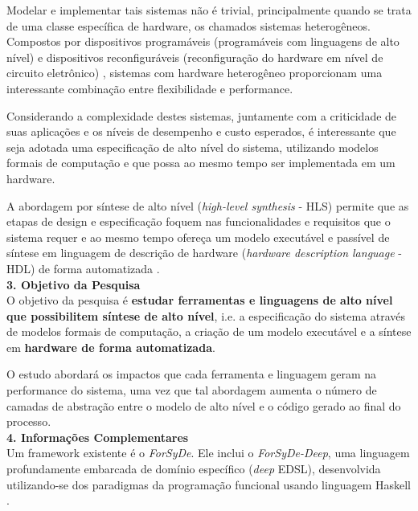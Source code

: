 Modelar e implementar tais sistemas não é trivial, principalmente quando se
trata de uma classe específica de hardware, os chamados sistemas
heterogêneos. Compostos por dispositivos programáveis (programáveis com
linguagens de alto nível) e dispositivos reconfiguráveis (reconfiguração do
hardware em nível de circuito eletrônico) \cite{Loubach2016a}, sistemas com
hardware heterogêneo proporcionam uma interessante combinação entre
flexibilidade e performance.

Considerando a complexidade destes sistemas, juntamente com a criticidade de suas aplicações e os níveis de desempenho e custo esperados, é interessante que seja adotada uma especificação de alto nível do sistema, utilizando modelos formais de computação e que possa ao mesmo tempo ser implementada em um hardware.

A abordagem por síntese de alto nível (\emph{high-level synthesis} - HLS)
permite que as etapas de design e especificação foquem nas funcionalidades e
requisitos que o sistema requer e ao mesmo tempo ofereça um modelo executável e
passível de síntese em linguagem de descrição de hardware (\emph{hardware
  description language} - HDL) de forma automatizada \cite{Loubach2022a}.\\

\noindent
\textbf{3. Objetivo da Pesquisa}\\
O objetivo da pesquisa é \textbf{estudar ferramentas e linguagens de alto nível
  que possibilitem síntese de alto nível}, i.e. a especificação do sistema
através de modelos formais de computação, a criação de um modelo executável e a
síntese em \textbf{hardware de forma automatizada}.

O estudo abordará os impactos que cada ferramenta e linguagem geram na performance do sistema, uma vez que tal abordagem aumenta o número de camadas de abstração entre o modelo de alto nível e o código gerado ao final do processo.\\

\noindent
\textbf{4. Informações Complementares}\\
Um framework existente é o \emph{ForSyDe}. Ele inclui o \emph{ForSyDe-Deep}, uma
linguagem profundamente embarcada de domínio específico (\emph{deep} EDSL),
desenvolvida utilizando-se dos paradigmas da programação funcional usando
linguagem Haskell \cite{Loubach2022a}\cite{ForSyDe-Deep}.

